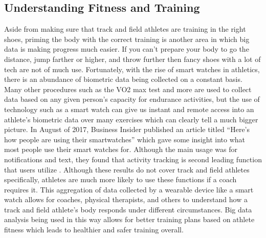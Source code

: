 \documentclass[sigconf]{acmart}
\begin{document}
\subsection{Understanding Fitness and Training}
Aside from making sure that track and field athletes are training in the right shoes, priming the body with the correct training is another area in which big data is making progress much easier. If you can't prepare your body to go the distance, jump farther or higher, and throw further then fancy shoes with a lot of tech are not of much use. Fortunately, with the rise of smart watches in athletics, there is an abundance of biometric data being collected on a constant basis. Many other procedures such as the VO2 max test and more are used to collect data based on any given person's capacity for endurance activities, but the use of technology such as a smart watch can give us instant and remote access into an athlete's biometric data over many exercises which can clearly tell a much bigger picture. In August of 2017, Business Insider published an article titled ``Here's how people are using their smartwatches'' which gave some insight into what most people use their smart watches for. Although the main usage was for notifications and text, they found that activity tracking is second leading function that users utilize \cite{Cakebread2017}. Although these results do not cover track and field athletes specifically, athletes are much more likely to use these functions if a coach requires it. This aggregation of data collected by a wearable device like a smart watch allows for coaches, physical therapists, and others to understand how a track and field athlete's body responds under different circumstances. Big data analysis being used in this way allows for better training plans based on athlete fitness which leads to healthier and safer training overall.
\end{document}

